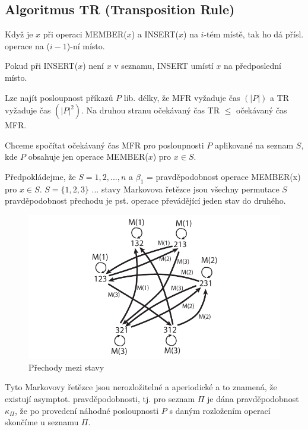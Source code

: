 \subsection{Algoritmus TR (Transposition Rule)}

Když je $x$ při operaci MEMBER($x$) a INSERT($x$) na $i$-tém místě, 
tak ho dá přísl. operace na ($i-1$)-ní místo.
\par
Pokud při INSERT($x$) není $x$ v seznamu, INSERT umístí $x$ na předposlední 
místo.
\par

\begin{pozn}
Lze najít posloupnost příkazů $P$ lib. délky, že MFR vyžaduje čas $(|P|)$ a
TR vyžaduje čas $(|P|^2)$. Na druhou stranu očekávaný čas TR $\leq$
očekávaný čas MFR.
\end{pozn}


Chceme spočítat očekávaný čas MFR pro posloupnosti $P$ aplikované na
seznam $S$,
kde $P$ obsahuje jen operace MEMBER($x$) pro $x \in S$. 
\par
Předpokládejme, že $S={1,2, ... , n}$ a $\beta_1$ = pravděpodobnost operace
MEMBER(x) pro $x \in S$.
$S = \{1,2,3\}$ ... stavy Markovova řetězce jsou všechny permutace $S$
pravděpodobnost přechodu je pst. operace převádějící jeden stav do
druhého.
\par

\begin{figure}[!htb]
\centering\includegraphics{pics/tr-markov}
\caption{Přechody mezi stavy}
\label{tr-markov}
\end{figure}


Tyto Markovovy řetězce jsou nerozložitelné a aperiodické a to znamená, že
existují asymptot. pravděpodobnosti, tj. pro seznam $\Pi$ je dána
pravděpodobnost ${\kappa}_{\Pi}$, že po provedení náhodné posloupnosti $P$ s
daným rozložením operací skončíme u seznamu $\Pi$.
\par

